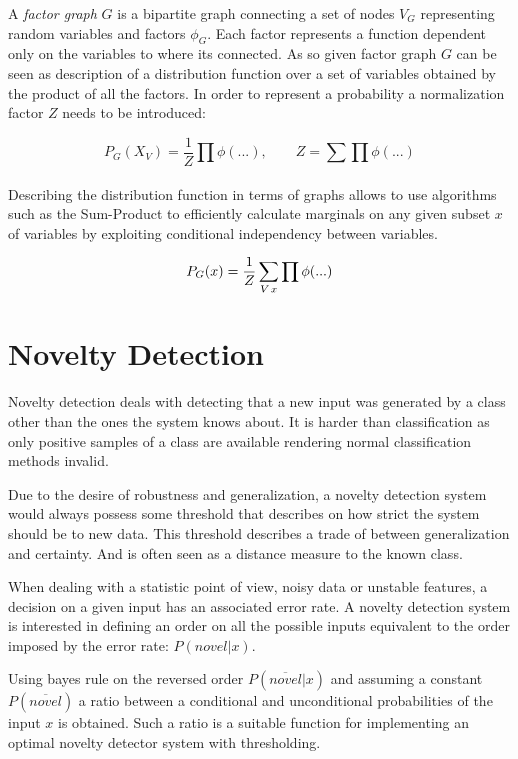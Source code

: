 \documentclass[runningheads,a4paper]{llncs}
\begin{document}
A \emph{factor graph} $G$ is a bipartite graph connecting a set of nodes $V_G$ representing
random variables and factors $\phi_G$.
Each factor represents a function dependent only on the variables to where its connected.
As so given factor graph $G$ can be seen as description of a distribution function over a set
of variables obtained by the product of all the factors. In order to represent a probability
a normalization factor $Z$ needs to be introduced:

\begin{equation}
P_G(X_V) = \frac{1}{Z}\prod_{}{\phi(...)},\qquad Z = \sum\prod{\phi(...)}
\end{equation}

Describing the distribution function in terms of graphs allows to use algorithms such as the
Sum-Product to efficiently calculate marginals on any given subset $x$ of variables by
exploiting conditional independency between variables.

\begin{equation}
P_G(x) = \frac{1}{Z}\sum_{V \\ x}{\prod{\phi(...)}}
\end{equation}

\section{Novelty Detection}
Novelty detection deals with detecting that a new input was generated by a class
other than the ones the system knows about.
It is harder than classification as only positive samples of a class are available
rendering normal classification methods invalid.

Due to the desire of robustness and generalization, a novelty detection system would
always possess some threshold that describes on how strict the system should be to
new data.
This threshold describes a trade of between generalization and certainty.
And is often seen as a distance measure to the known class.

When dealing with a statistic point of view, noisy data or unstable features, a decision on a
given input has an associated error rate. A novelty detection system is interested in defining an
order on all the possible inputs equivalent to the order imposed by the error rate: $P(novel|x)$.

Using bayes rule on the reversed order $P(\overline{novel}|x)$ and assuming a constant $P(\overline{novel})$
a ratio between a conditional and unconditional probabilities of the input $x$ is obtained.
Such a ratio is a suitable function for implementing an optimal novelty detector system with
thresholding.
\end{document}
